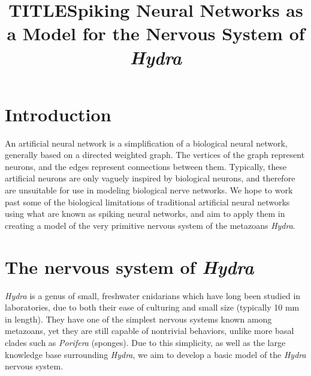 \documentclass{article}
\date{}
\title{TITLE}
\title{Spiking Neural Networks as a Model for the Nervous System of \textit{Hydra}}
\begin{document}
\maketitle

\section{Introduction}

An artificial neural network is a simplification of a biological neural network, generally based on a directed weighted graph. The vertices of the graph represent neurons, and the edges represent connections between them. Typically, these artificial neurons are only vaguely inspired by biological neurons, and therefore are unsuitable for use in modeling biological nerve networks. We hope to work past some of the biological limitations of traditional artificial neural networks using what are known as spiking neural networks, and aim to apply them in creating a model of the very primitive nervous system of the metazoans \textit{Hydra}.


\section{The nervous system of \textit{Hydra}}
\textit{Hydra} is a genus of small, freshwater cnidarians which have long been studied in laboratories, due to both their ease of culturing and small size (typically 10 mm in length). They have one of the simplest nervous systems known among metazoans, yet they are still capable of nontrivial behaviors, unlike more basal clades such as \textit{Porifera} (sponges). Due to this simplicity, as well as the large knowledge base surrounding \textit{Hydra}, we aim to develop a basic model of the \textit{Hydra} nervous system.
\end{document}
